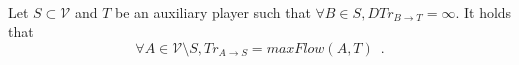 {}
\begin{theorem} \ \\
  \label{trustmany}
  Let $S \subset \mathcal{V}$ and $T$ be an auxiliary player such that $\forall B \in S, DTr_{B \rightarrow T} = \infty$. It
  holds that
  \begin{equation*}
    \forall A \in \mathcal{V} \setminus S, Tr_{A \rightarrow S} = maxFlow\left(A, T\right) \enspace.
  \end{equation*}
\end{theorem}       
